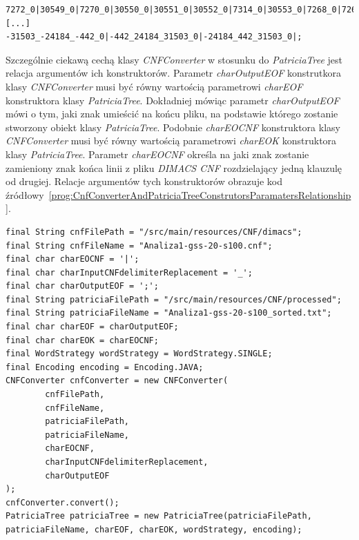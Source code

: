 		\begin{program}
			\caption{Przykład fragmentu pliku stworzonego po przekonwertowaniu pliku z kodu źródłowego~\ref{prog:CNFsourceFile} na plik na podstawie którego zostanie stworzony obiekt klasy \emph{PatriciaTree} o nazwie ``Analiza1-gss-20-s100\textunderscore sorted.txt`` wykorzystanego w kodzie źródłowym \ref{prog:CnfConverterAndPatriciaTreeConstrutorsParamatersRelationship}. Plik ma rozmiar równy 1.5 Mb.}\label{prog:PatriciaSourceFile}
    		\begin{lstlisting}[basicstyle=\scriptsize,]
7272_0|30549_0|7270_0|30550_0|30551_0|30552_0|7314_0|30553_0|7268_0|7267_0|// [...]
-31503_-24184_-442_0|-442_24184_31503_0|-24184_442_31503_0|;
    		\end{lstlisting}
		\end{program}
		
		Szczególnie ciekawą cechą klasy \emph{CNFConverter} w stosunku do \emph{PatriciaTree} jest relacja argumentów ich konstruktorów. Parametr \emph{charOutputEOF} konstrutkora klasy \emph{CNFConverter} musi być równy wartością parametrowi \emph{charEOF} konstruktora klasy \emph{PatriciaTree}. Dokładniej mówiąc parametr \emph{charOutputEOF} mówi o tym, jaki znak umieścić na końcu pliku, na podstawie którego zostanie stworzony obiekt klasy \emph{PatriciaTree}. Podobnie \emph{charEOCNF} konstruktora klasy \emph{CNFConverter} musi być równy wartością parametrowi \emph{charEOK} konstruktora klasy \emph{PatriciaTree}. Parametr \emph{charEOCNF} określa na jaki znak zostanie zamieniony znak końca linii z pliku \emph{DIMACS CNF} rozdzielający jedną klauzulę od drugiej. Relacje argumentów tych konstruktorów obrazuje kod źródłowy~\ref{prog:CnfConverterAndPatriciaTreeConstrutorsParamatersRelationship}. 
		
		\begin{program}
			\caption{Przykład użycia konstruktorów klas \emph{CNFConverter} oraz \emph{PatriciaTree} obrazujący relację między argumentami ich konstruktorów.}\label{prog:CnfConverterAndPatriciaTreeConstrutorsParamatersRelationship}
    		\begin{lstlisting}[basicstyle=\scriptsize,]
final String cnfFilePath = "/src/main/resources/CNF/dimacs";
final String cnfFileName = "Analiza1-gss-20-s100.cnf";
final char charEOCNF = '|';
final char charInputCNFdelimiterReplacement = '_';
final char charOutputEOF = ';';
final String patriciaFilePath = "/src/main/resources/CNF/processed";
final String patriciaFileName = "Analiza1-gss-20-s100_sorted.txt";
final char charEOF = charOutputEOF;
final char charEOK = charEOCNF;
final WordStrategy wordStrategy = WordStrategy.SINGLE;
final Encoding encoding = Encoding.JAVA;
CNFConverter cnfConverter = new CNFConverter(
        cnfFilePath,
        cnfFileName,
        patriciaFilePath,
        patriciaFileName,
        charEOCNF,
        charInputCNFdelimiterReplacement,
        charOutputEOF
);
cnfConverter.convert();
PatriciaTree patriciaTree = new PatriciaTree(patriciaFilePath, patriciaFileName, charEOF, charEOK, wordStrategy, encoding);
    		\end{lstlisting}
		\end{program}
		
